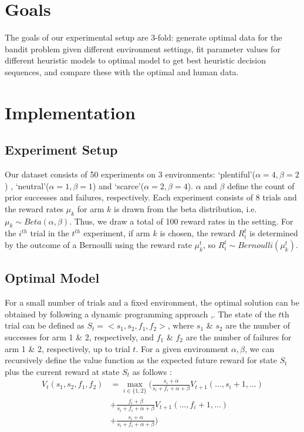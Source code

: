 \section{Goals}
The goals of our experimental setup are 3-fold: generate optimal data for the bandit problem given different environment settings, fit parameter values for different heuristic models to optimal model to get best heuristic decision sequences, and compare these with the optimal and human data.

\section{Implementation}
\subsection{Experiment Setup}
Our dataset \cite{data} consists of 50 experiments on 3 environments: ‘plentiful’($\alpha=4,\beta=2$) , ‘neutral’($\alpha=1,\beta=1$) and ‘scarce’($\alpha=2,\beta=4$). $\alpha$ and $\beta$ define the count of prior successes and failures, respectively. Each experiment consists of 8 trials and the reward rates $\mu_k$ for arm $k$ is drawn from the beta distribution, i.e. $\mu_k \sim Beta (\alpha, \beta)$. Thus, we draw a total of 100 reward rates in the setting. For the $i^{th}$ trial in the $t^{th}$ experiment, if arm $k$ is chosen, the reward $R_i^t$ is determined by the outcome of a Bernoulli using the reward rate $\mu_k^t$, so $R_i^t \sim Bernoulli (\mu_k^t)$.

\subsection{Optimal Model}
For a small number of trials and a fixed environment, the optimal solution can be obtained by following a dynamic programming approach \cite{kaelbling},\cite{steyvers}. The state of the $t$th trial can be defined as $S_t = <s_1,s_2,f_1,f_2>$, where $s_1$ \& $s_2$ are the number of successes for arm 1 \& 2, respectively, and $f_1$ \& $f_2$ are the number of failures for arm 1 \& 2, respectively, up to trial $t$. For a given environment $\alpha,\beta$, we can recursively define the value function as the expected future reward for state $S_t$ plus the current reward at state $S_t$ as follows : 
\begin{align*}
	V_t(s_1,s_2,f_1,f_2) &= \max_{i \in \{1,2\}} 
	\Big(
	\frac{s_i + \alpha}{s_i + f_i + \alpha + \beta} V_{t+1}(...,s_i+1,...) \\
	&+ \frac{f_i + \beta}{s_i + f_i + \alpha + \beta} V_{t+1}(...,f_i+1,...)\\
	&+ \frac{s_i + \alpha}{s_i + f_i + \alpha + \beta} 
	\Big)	
\end{align*}


